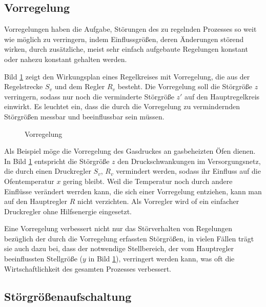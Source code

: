 \subsection{Vorregelung}

Vorregelungen haben die Aufgabe, Störungen des zu regelnden Prozesses so weit wie möglich zu verringern, indem Einflussgrößen, deren Änderungen störend wirken, durch zusätzliche, meist sehr einfach aufgebaute Regelungen konstant oder nahezu konstant gehalten werden.

Bild \ref{fig:7-2} zeigt den Wirkungsplan eines Regelkreises mit Vorregelung, die aus der Regelstrecke \(S_v\) und dem Regler \(R_v\) besteht.
Die Vorregelung soll die Störgröße \(z\) verringern, sodass nur noch die verminderte Störgröße \(z'\) auf den Hauptregelkreis einwirkt.
Es leuchtet ein, dass die durch die Vorregelung zu vermindernden Störgrößen messbar und beeinflussbar sein müssen.

\begin{figure}[ht]
    \centering
    \caption{Vorregelung}
    \label{fig:7-2}
\end{figure}

Als Beispiel möge die Vorregelung des Gasdruckes an gasbeheizten Öfen dienen.
In Bild \ref{fig:7-2} entspricht die Störgröße \(z\) den Druckschwankungen im Versorgungsnetz, die durch einen Druckregler \(S_v\), \(R_v\) vermindert werden, sodass ihr Einfluss auf die Ofentemperatur \(x\) gering bleibt.
Weil die Temperatur noch durch andere Einflüsse verändert werrden kann, die sich einer Vorregelung entziehen, kann man auf den Hauptregler \(R\) nicht verzichten.
Als Vorregler wird of ein einfacher Druckregler ohne Hilfsenergie eingesetzt.

Eine Vorregelung verbessert nicht nur das Störverhalten von Regelungen bezüglich der durch die Vorregelung erfassten Störgrößen, in vielen Fällen trägt sie auch dazu bei, dass der notwendige Stellbereich, der vom Hauptregler beeinflussten Stellgröße (\(y\) in Bild \ref{fig:7-2}), verringert werden kann, was oft die Wirtschaftlichkeit des gesamten Prozesses verbessert.


\subsection{Störgrößenaufschaltung}

